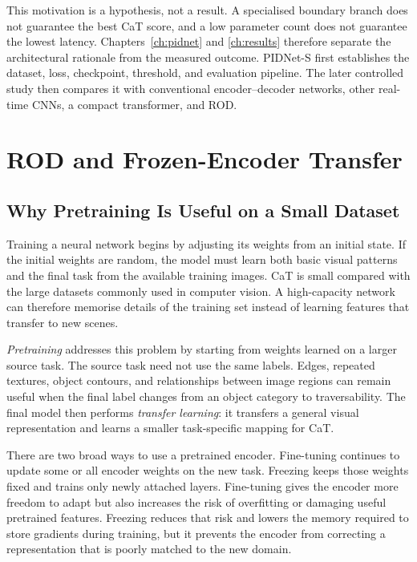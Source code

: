 This motivation is a hypothesis, not a result. A specialised boundary branch
does not guarantee the best CaT score, and a low parameter count does not
guarantee the lowest latency. Chapters~\ref{ch:pidnet} and
\ref{ch:results} therefore separate the architectural rationale from the
measured outcome. PIDNet-S first establishes the dataset, loss, checkpoint,
threshold, and evaluation pipeline. The later controlled study then compares
it with conventional encoder--decoder networks, other real-time CNNs, a compact
transformer, and ROD.

\section{ROD and Frozen-Encoder Transfer}

\subsection{Why Pretraining Is Useful on a Small Dataset}

Training a neural network begins by adjusting its weights from an initial
state. If the initial weights are random, the model must learn both basic
visual patterns and the final task from the available training images. CaT is
small compared with the large datasets commonly used in computer vision. A
high-capacity network can therefore memorise details of the training set
instead of learning features that transfer to new scenes.

\emph{Pretraining} addresses this problem by starting from weights learned on
a larger source task. The source task need not use the same labels. Edges,
repeated textures, object contours, and relationships between image regions
can remain useful when the final label changes from an object category to
traversability. The final model then performs \emph{transfer learning}: it
transfers a general visual representation and learns a smaller task-specific
mapping for CaT.

There are two broad ways to use a pretrained encoder. Fine-tuning continues to
update some or all encoder weights on the new task. Freezing keeps those
weights fixed and trains only newly attached layers. Fine-tuning gives the
encoder more freedom to adapt but also increases the risk of overfitting or
damaging useful pretrained features. Freezing reduces that risk and lowers the
memory required to store gradients during training, but it prevents the
encoder from correcting a representation that is poorly matched to the new
domain.

